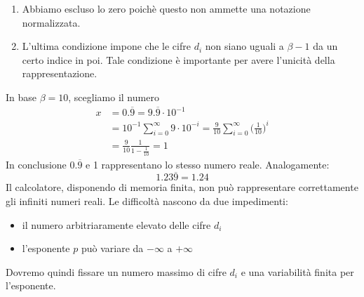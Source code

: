 \documentclass[12pt]{report}
\begin{document}
\begin{note}{}{}
	\begin{enumerate}
		\item Abbiamo escluso lo zero poichè questo non ammette una notazione normalizzata.
		\item L'ultima condizione impone che le cifre $d_i$ non siano uguali a $\beta - 1$ da un certo indice in poi. Tale condizione è importante per avere l'unicità della rappresentazione.
	\end{enumerate}
\end{note}
\begin{example}{}{}
	In base $\beta = 10$, scegliamo il numero
	\begin{align*}
		x &= 0.\overline{9} = 9.\overline{9} \cdot 10^{-1} \\
		&= 10^{-1} \sum_{i=0}^{\infty}9 \cdot 10^{-i} = \frac{9}{10}\sum_{i=0}^{\infty}\Bigg(\frac{1}{10}\Bigg)^i \\
		&= \frac{9}{10}\frac{1}{1-\frac{1}{10}} = 1
	\end{align*}
	In conclusione $0.\overline{9}$ e 1 rappresentano lo stesso  numero reale. Analogamente:
	\[
	1.23\overline{9} = 1.24
	\]
	Il calcolatore, disponendo di memoria finita, non può rappresentare correttamente gli infiniti numeri reali. Le difficoltà nascono da due impedimenti:
	\begin{itemize}
		\item il numero arbitriaramente elevato delle cifre $d_i$
		\item l'esponente $p$ può variare da $-\infty$ a $+\infty$
	\end{itemize}
	Dovremo quindi fissare un numero massimo di cifre $d_i$ e una variabilità finita per l'esponente.
\end{example}
\end{document}
